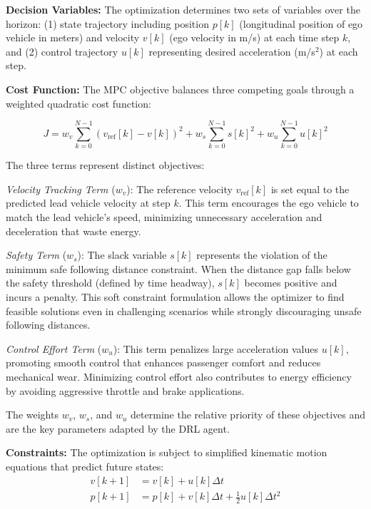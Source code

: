 \documentclass[conference,onecolumn,draftclsnofoot]{IEEEtran}
\begin{document}
\textbf{Decision Variables:} The optimization determines two sets of variables over the horizon: (1) state trajectory including position $p[k]$ (longitudinal position of ego vehicle in meters) and velocity $v[k]$ (ego velocity in m/s) at each time step $k$, and (2) control trajectory $u[k]$ representing desired acceleration (m/s$^2$) at each step.

\textbf{Cost Function:} The MPC objective balances three competing goals through a weighted quadratic cost function:

\begin{equation}
J = w_v \sum_{k=0}^{N-1} (v_{\text{ref}}[k] - v[k])^2 + w_s \sum_{k=0}^{N-1} s[k]^2 + w_u \sum_{k=0}^{N-1} u[k]^2
\end{equation}

The three terms represent distinct objectives:

\textit{Velocity Tracking Term} ($w_v$): The reference velocity $v_{\text{ref}}[k]$ is set equal to the predicted lead vehicle velocity at step $k$. This term encourages the ego vehicle to match the lead vehicle's speed, minimizing unnecessary acceleration and deceleration that waste energy.

\textit{Safety Term} ($w_s$): The slack variable $s[k]$ represents the violation of the minimum safe following distance constraint. When the distance gap falls below the safety threshold (defined by time headway), $s[k]$ becomes positive and incurs a penalty. This soft constraint formulation allows the optimizer to find feasible solutions even in challenging scenarios while strongly discouraging unsafe following distances.

\textit{Control Effort Term} ($w_u$): This term penalizes large acceleration values $u[k]$, promoting smooth control that enhances passenger comfort and reduces mechanical wear. Minimizing control effort also contributes to energy efficiency by avoiding aggressive throttle and brake applications.

The weights $w_v$, $w_s$, and $w_u$ determine the relative priority of these objectives and are the key parameters adapted by the DRL agent.

\textbf{Constraints:} The optimization is subject to simplified kinematic motion equations that predict future states:
\begin{align}
v[k+1] &= v[k] + u[k] \Delta t \\
p[k+1] &= p[k] + v[k] \Delta t + \frac{1}{2}u[k]\Delta t^2
\end{align}
\end{document}
